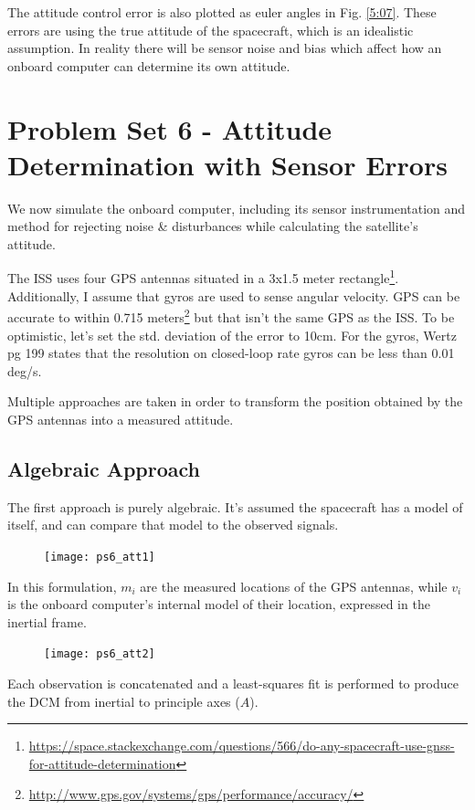 \documentclass[12pt, letterpaper]{article}
\begin{document}
The attitude control error is also plotted as euler angles in Fig. \ref{5:07}. These errors are using the true attitude of the spacecraft, which is an idealistic assumption. In reality there will be sensor noise and bias which affect how an onboard computer can determine its own attitude.

\section{Problem Set 6 - Attitude Determination with Sensor Errors}

We now simulate the onboard computer, including its sensor instrumentation and method for rejecting noise \& disturbances while calculating the satellite's attitude. 

The ISS uses four GPS antennas situated in a 3x1.5 meter rectangle\footnote{\url{https://space.stackexchange.com/questions/566/do-any-spacecraft-use-gnss-for-attitude-determination}}. Additionally, I assume that gyros are used to sense angular velocity. GPS can be accurate to within 0.715 meters\footnote{\url{http://www.gps.gov/systems/gps/performance/accuracy/}} but that isn't the same GPS as the ISS. To be optimistic, let's set the std. deviation of the error to 10cm. For the gyros, Wertz pg 199 states that the resolution on closed-loop rate gyros can be less than 0.01 deg/s.

Multiple approaches are taken in order to transform the position obtained by the GPS antennas into a measured attitude.

\subsection{Algebraic Approach}
The first approach is purely algebraic. It's assumed the spacecraft has a model of itself, and can compare that model to the observed signals.

\begin{figure}[H]
	\centering
	\texttt{[image: ps6\_att1]}
\end{figure}

In this formulation, $m_i$ are the measured locations of the GPS antennas, while $v_i$ is the onboard computer's internal model of their location, expressed in the inertial frame.

\begin{figure}[H]
	\centering
	\texttt{[image: ps6\_att2]}
\end{figure}

Each observation is concatenated and a least-squares fit is performed to produce the DCM from inertial to principle axes ($A$).
\end{document}

